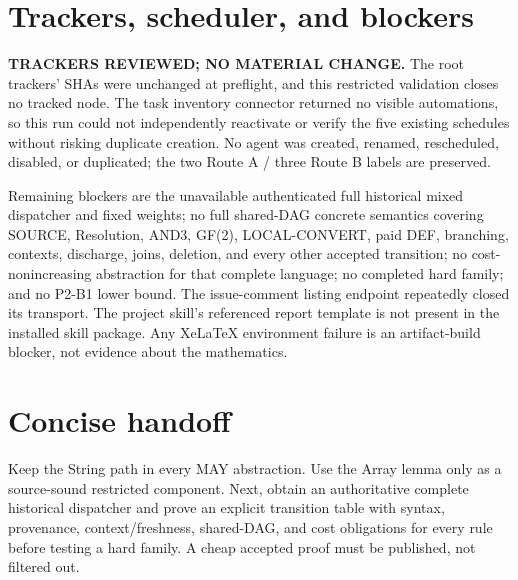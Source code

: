 \documentclass[11pt]{article}
\begin{document}
\section*{Trackers, scheduler, and blockers}
\noindent
\textbf{TRACKERS REVIEWED; NO MATERIAL CHANGE.}  The root trackers' SHAs were
unchanged at preflight, and this restricted validation closes no tracked node.
The task inventory connector returned no visible automations, so this run could
not independently reactivate or verify the five existing schedules without
risking duplicate creation.  No agent was created, renamed, rescheduled,
disabled, or duplicated; the two Route A / three Route B labels are preserved.

Remaining blockers are the unavailable authenticated full historical mixed
dispatcher and fixed weights; no full shared-DAG concrete semantics covering
SOURCE, Resolution, AND3, GF(2), LOCAL-CONVERT, paid DEF, branching, contexts,
discharge, joins, deletion, and every other accepted transition; no
cost-nonincreasing abstraction for that complete language; no completed hard
family; and no P2-B1 lower bound.  The issue-comment listing endpoint repeatedly
closed its transport.  The project skill's referenced report template is not
present in the installed skill package.  Any XeLaTeX environment failure is an
artifact-build blocker, not evidence about the mathematics.

\section*{Concise handoff}
Keep the String path in every MAY abstraction.  Use the Array lemma only as a
source-sound restricted component.  Next, obtain an authoritative complete
historical dispatcher and prove an explicit transition table with syntax,
provenance, context/freshness, shared-DAG, and cost obligations for every rule
before testing a hard family.  A cheap accepted proof must be published, not
filtered out.

\end{document}
